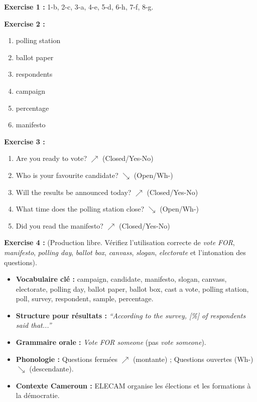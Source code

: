 \documentclass[11pt]{article}
\newcommand{\cle}[1]{{\popxbold\color{popdark}#1}}
\begin{document}
\begin{corrige}[Exercice 1 à 3]
\textbf{Exercise 1 :} 1-b, 2-c, 3-a, 4-e, 5-d, 6-h, 7-f, 8-g.

\textbf{Exercise 2 :}
\begin{enumerate}
\item polling station
\item ballot paper
\item respondents
\item campaign
\item percentage
\item manifesto
\end{enumerate}

\textbf{Exercise 3 :}
\begin{enumerate}
\item Are you ready to vote? $\nearrow$ (Closed/Yes-No)
\item Who is your favourite candidate? $\searrow$ (Open/Wh-)
\item Will the results be announced today? $\nearrow$ (Closed/Yes-No)
\item What time does the polling station close? $\searrow$ (Open/Wh-)
\item Did you read the manifesto? $\nearrow$ (Closed/Yes-No)
\end{enumerate}

\textbf{Exercise 4 :} (Production libre. Vérifiez l'utilisation correcte de \emph{vote FOR}, \emph{manifesto}, \emph{polling day}, \emph{ballot box}, \emph{canvass}, \emph{slogan}, \emph{electorate} et l'intonation des questions).
\end{corrige}

\begin{aretenir}
\begin{itemize}
\item \textbf{Vocabulaire clé :} \cle{campaign}, \cle{candidate}, \cle{manifesto}, \cle{slogan}, \cle{canvass}, \cle{electorate}, \cle{polling day}, \cle{ballot paper}, \cle{ballot box}, \cle{cast a vote}, \cle{polling station}, \cle{poll}, \cle{survey}, \cle{respondent}, \cle{sample}, \cle{percentage}.
\item \textbf{Structure pour résultats :} \emph{``According to the survey, [\%] of respondents said that...''}
\item \textbf{Grammaire orale :} \emph{Vote FOR someone} (pas \emph{vote someone}).
\item \textbf{Phonologie :} Questions fermées $\nearrow$ (montante) ; Questions ouvertes (Wh-) $\searrow$ (descendante).
\item \textbf{Contexte Cameroun :} ELECAM organise les élections et les formations à la démocratie.
\end{itemize}
\end{aretenir}
\end{document}
